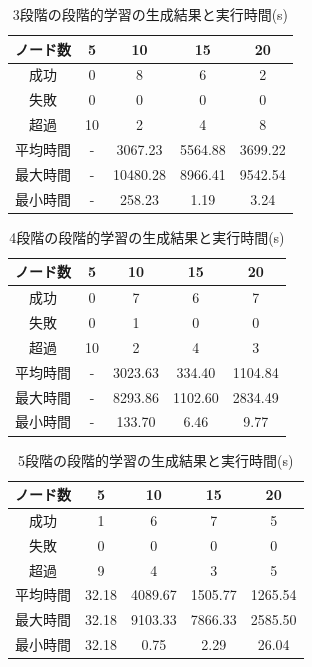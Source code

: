 \documentclass[exploratorypaper]{jsaiart} %
\begin{document}
\begin{table}[t]
\caption{3段階の段階的学習の生成結果と実行時間(s)}
\label{tbl:result1}
\begin{tabular}{c|cccc}
    ノード数&	5&	10&	15&	20\\
    \hline \hline
    成功&	0&	8&	6&	2\\
    失敗&	0&	0&	0&	0\\
    超過&	10&	2&	4&	8\\
    \hline
    平均時間&	- &	3067.23&	5564.88&	3699.22\\
    最大時間&	- &	10480.28&	8966.41&	9542.54\\
    最小時間&	- &	258.23&	1.19&	3.24\\
    \hline
\end{tabular}
\end{table}

\begin{table}[t]
\caption{4段階の段階的学習の生成結果と実行時間(s)}
\label{tbl:result2}
\begin{tabular}{c|cccc}
    ノード数&	5&	10&	15&	20\\
    \hline \hline
    成功&	0&	7&	6&	7\\
    失敗&	0&	1&	0&	0\\
    超過&	10&	2&	4&	3\\
    \hline
    平均時間&	-&	3023.63&	334.40&	1104.84\\
    最大時間&	- &	8293.86&	1102.60&	2834.49\\
    最小時間&	- &	133.70&	6.46&	9.77\\
    \hline
\end{tabular}
\end{table}

\begin{table}[t]
\caption{5段階の段階的学習の生成結果と実行時間(s)}
\label{tbl:result3}
\begin{tabular}{c|cccc}
    ノード数&	5&	10&	15&	20\\
    \hline \hline
    成功&	1&	6&	7&	5\\
    失敗&	0&	0&	0&	0\\
    超過&	9&	4&	3&	5\\
    \hline
    平均時間&	32.18&	4089.67&	1505.77&	1265.54\\
    最大時間&	32.18&	9103.33&	7866.33&	2585.50\\
    最小時間&	32.18&	0.75&	2.29&	26.04\\
    \hline
\end{tabular}
\end{table}
\end{document}
